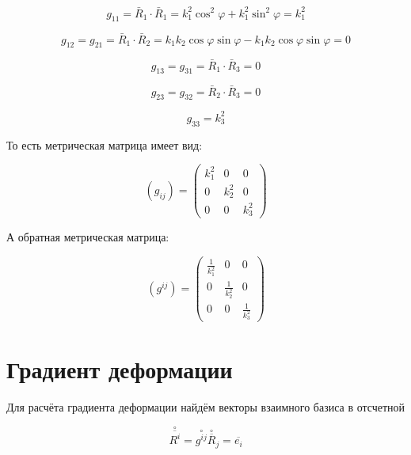 \documentclass[14pt,a4paper]{scrartcl}
\begin{document}
\begin{equation*}
	g_{11}=\bar{R}_{1} \cdot \bar{R}_{1}=k_{1}^{2} \cos ^{2} \varphi+k_{1}^{2} \sin ^{2} \varphi=k_{1}^{2}
\end{equation*}

\begin{equation*}
	g_{12}=g_{21}=\bar{R}_{1} \cdot \bar{R}_{2}=k_{1} k_{2} \cos \varphi \sin \varphi-k_{1} k_{2} \cos \varphi \sin \varphi=0
\end{equation*}

\begin{equation*}
	g_{13}=g_{31}=\bar{R}_{1} \cdot \bar{R}_{3}=0
\end{equation*}

\begin{equation*}
	g_{23}=g_{32}=\bar{R}_{2} \cdot \bar{R}_{3}=0
\end{equation*}

\begin{equation*}
	g_{33}=k_{3}^{2}
\end{equation*}

То есть метрическая матрица имеет вид:

\begin{equation*}
	\left(g_{i j}\right)=\left(\begin{array}{ccc}
	k_{1}^{2} & 0 & 0 \\
	0 & k_{2}^{2} & 0 \\
	0 & 0 & k_{3}^{2}
	\end{array}\right)
\end{equation*}

А обратная метрическая матрица:

\begin{equation*}
	\left(g^{i j}\right)=\left(\begin{array}{ccc}
	\frac{1}{k_{1}^{2}} & 0 & 0 \\
	0 & \frac{1}{k_{2}^{2}} & 0 \\
	0 & 0 & \frac{1}{k_{3}^{2}}
	\end{array}\right)
\end{equation*}



\section{Градиент деформации}

Для расчёта градиента деформации найдём векторы взаимного базиса в отсчетной

\begin{equation*}
	\overset{\circ}{\overline{R^i}} = \overset{\circ}{g^{ij}} \overset{\circ}{\overline{R}}_j = \overline{e_{i}}
\end{equation*}
\end{document}
